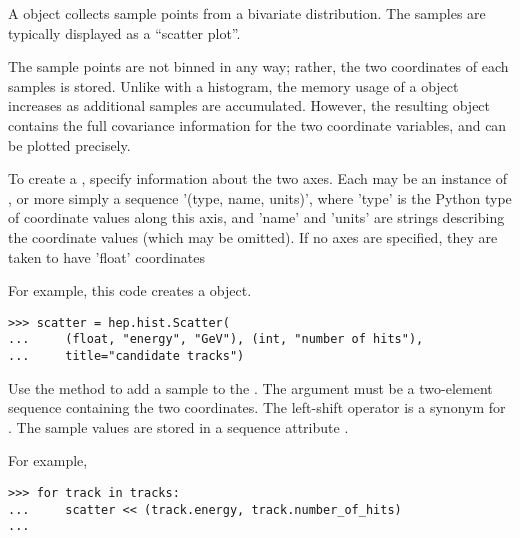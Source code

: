 A  object collects sample points from a
bivariate distribution.  The samples are typically displayed as a
``scatter plot''.

The sample points are not binned in any way; rather, the two coordinates
of each samples is stored.  Unlike with a histogram, the memory usage of
a  object increases as additional samples are
accumulated.  However, the resulting object contains the full covariance
information for the two coordinate variables, and can be plotted
precisely.

To create a , specify information about the two axes.
Each may be an instance of , or more simply a
sequence '(type, name, units)', where 'type' is the Python type of
coordinate values along this axis, and 'name' and 'units' are strings
describing the coordinate values (which may be omitted).  If no axes are
specified, they are taken to have 'float' coordinates

For example, this code creates a  object.
\begin{verbatim}
>>> scatter = hep.hist.Scatter(
...     (float, "energy", "GeV"), (int, "number of hits"),
...     title="candidate tracks")
\end{verbatim}

Use the  method to add a sample to the
.  The argument must be a two-element sequence containing
the two coordinates.  The left-shift operator \code{<<} is a synonym for
.  The sample values are stored in a sequence
attribute .

For example,
\begin{verbatim}
>>> for track in tracks:
...     scatter << (track.energy, track.number_of_hits)
... 
\end{verbatim}

